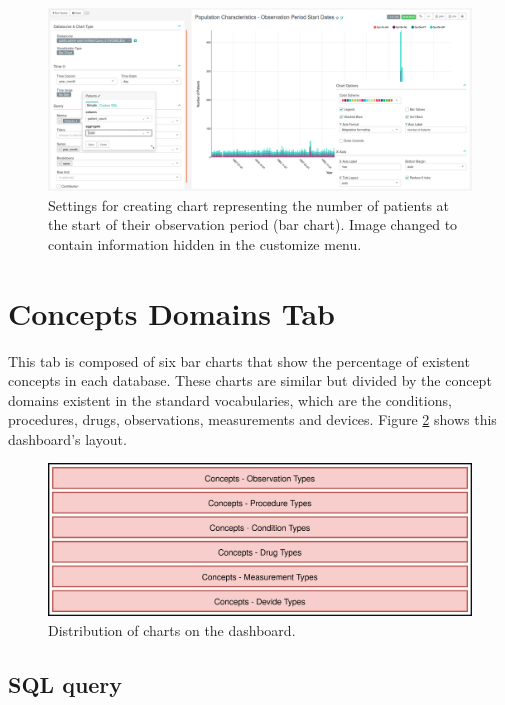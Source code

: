 \documentclass[
]{book}
\begin{document}
\begin{figure}
\includegraphics[width=1\linewidth]{images/populationCharacteristicsObservationPeriodStartDates} \caption{Settings for creating chart representing the number of patients at the start of their observation period (bar chart). Image changed to contain information hidden in the customize menu.}\label{fig:visitTypes5}
\end{figure}

\hypertarget{concepts-domains-tab}{%
\section{Concepts Domains Tab}\label{concepts-domains-tab}}

This tab is composed of six bar charts that show the percentage of existent concepts in each database. These charts are similar but divided by the concept domains existent in the standard vocabularies, which are the conditions, procedures, drugs, observations, measurements and devices. Figure \ref{fig:conceptsDomainsLayout} shows this dashboard's layout.

\begin{figure}
\includegraphics[width=1\linewidth]{images/conceptsDomainsLayout} \caption{Distribution of charts on the dashboard.}\label{fig:conceptsDomainsLayout}
\end{figure}

\hypertarget{sql-query-23}{%
\subsection{SQL query}\label{sql-query-23}}
\end{document}
